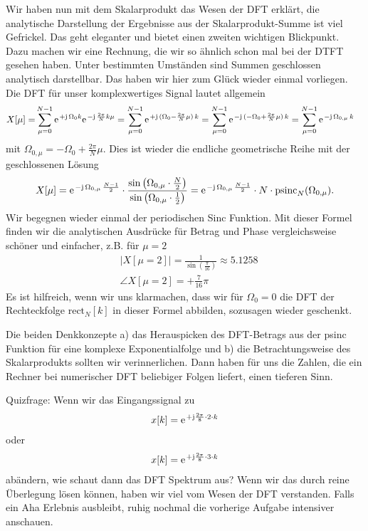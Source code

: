 \begin{ExCalc}
Wir haben nun mit dem Skalarprodukt das Wesen der DFT erklärt,
die analytische Darstellung der Ergebnisse aus der Skalarprodukt-Summe
ist viel Gefrickel.
%
Das geht eleganter und bietet einen zweiten wichtigen Blickpunkt. Dazu
machen wir eine Rechnung, die wir so ähnlich schon mal bei der DTFT gesehen haben.
Unter bestimmten Umständen sind Summen geschlossen analytisch darstellbar.
Das haben wir hier zum Glück wieder einmal vorliegen.
Die DFT für unser komplexwertiges Signal lautet allgemein
\begin{align}
X[\mu] =& \sum_{\mu=0}^{N-1} \e^{+\im\,\Omega_0 k} \e^{-\im\,\frac{2\pi}{N} k \mu}
=  \sum_{\mu=0}^{N-1} \e^{+\im\,(\Omega_0 - \frac{2\pi}{N} \mu) \, k}
=  \sum_{\mu=0}^{N-1} \e^{-\im\,(-\Omega_0 + \frac{2\pi}{N} \mu) \, k}
=  \sum_{\mu=0}^{N-1} \e^{-\im\, \Omega_{0,\mu} \,k}
\end{align}
mit $\Omega_{0,\mu} = -\Omega_0 + \frac{2\pi}{N} \mu$.
Dies ist wieder die endliche geometrische Reihe mit der geschlossenen Lösung
\begin{align}
X[\mu] = \e^{-\im \,\Omega_{0,\mu}\,\frac{N-1}{2}} \cdot
\frac{\sin\left(\Omega_{0,\mu}\cdot\frac{N}{2}\right)}{\sin\left(\Omega_{0,\mu}\cdot\frac{1}{2}\right)}
=\e^{-\im \,\Omega_{0,\mu}\,\frac{N-1}{2}} \cdot N \cdot \mathrm{psinc}_N(\Omega_{0,\mu})
.
\end{align}
Wir begegnen wieder einmal der periodischen Sinc Funktion.
%
Mit dieser Formel finden wir die analytischen Ausdrücke für Betrag und Phase
vergleichsweise schöner und einfacher, z.B. für $\mu=2$
\begin{align}
&|X[\mu=2]| = \frac{1}{\sin(\frac{\pi}{16})} \approx 5.1258\\
&\angle X[\mu=2] = +\frac{7}{16}\pi
\end{align}
Es ist hilfreich, wenn wir uns klarmachen, dass wir für $\Omega_0=0$ die DFT der
Rechteckfolge $\mathrm{rect}_N[k]$
in dieser Formel abbilden, sozusagen wieder geschenkt.

Die beiden Denkkonzepte a) das Herauspicken des DFT-Betrags aus der psinc Funktion
für eine komplexe Exponentialfolge und b) die Betrachtungsweise des
Skalarprodukts sollten wir verinnerlichen. Dann haben für uns die Zahlen,
die ein Rechner bei numerischer DFT beliebiger Folgen liefert, einen tieferen
Sinn.

Quizfrage: Wenn wir das Eingangssignal zu
\begin{align}
x[k] = \e^{+\im \frac{2\pi}{8} \cdot 2 \cdot k}
\end{align}
oder
\begin{align}
x[k] = \e^{+\im \frac{2\pi}{8} \cdot 3 \cdot k}
\end{align}
abändern, wie schaut dann das DFT Spektrum aus? Wenn wir das durch reine
Überlegung lösen können, haben wir viel vom Wesen der DFT
verstanden.
%
Falls ein Aha Erlebnis ausbleibt, ruhig nochmal die vorherige Aufgabe
intensiver anschauen.

\end{ExCalc}

